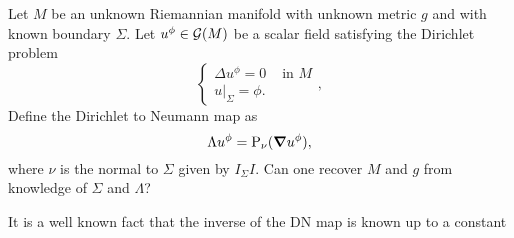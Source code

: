 \begin{question}
Let $M$ be an unknown Riemannian manifold with unknown metric $g$ and with known boundary $\Sigma$.  Let $u^\phi \in \mathcal{G}(M)$ be a scalar field satisfying the Dirichlet problem
\begin{equation}
\label{eq:dirichlet_problem_multivector}
\begin{cases} \Delta u^\phi = 0 & \textrm{ in $M$} \\  u\vert_\Sigma = \phi. \end{cases},
\end{equation}
Define the Dirichlet to Neumann map as
\[
\Lambda u^\phi = \operatorname{P}_{\nu}(\boldsymbol{\nabla} u^\phi),
\]
where $\nu$ is the normal to $\Sigma$ given by $I_\Sigma I$.  Can one recover $M$ and $g$ from knowledge of $\Sigma$ and $\Lambda$?
\end{question}

It is a well known fact that the inverse of the DN map is known up to a constant



